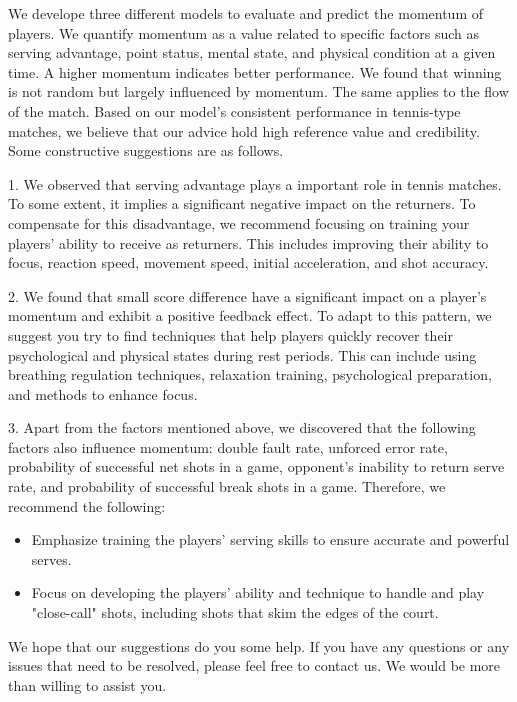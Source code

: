\documentclass{mcmthesis}
\begin{document}
\maketitle
\tableofcontents
\newpage
\memodate{\today}
 \begin{memo}[Memorandum]
We develope three different models to evaluate and predict the momentum of players. We quantify momentum as a value related to specific factors such as serving advantage, point status, mental state, and physical condition at a given time. A higher momentum indicates better performance. We found that winning is not random but  largely influenced by momentum. The same applies to the flow of the match. Based on our model's consistent performance in tennis-type matches, we believe that our advice hold high reference value and credibility. Some constructive suggestions are as follows.

1. We observed that serving advantage plays a important role in tennis matches. To some extent, it implies a significant negative impact on the returners. To compensate for this disadvantage, we recommend focusing on training your players' ability to receive as returners. This includes improving their ability to focus, reaction speed, movement speed, initial acceleration, and shot accuracy.

2. We found that small score difference have a significant impact on a player's momentum and exhibit a positive feedback effect. To adapt to this pattern, we suggest you try to find techniques that help players quickly recover their psychological and physical states during rest periods. This can include using breathing regulation techniques, relaxation training, psychological preparation, and methods to enhance focus. 

3. Apart from the factors mentioned above, we discovered that the following factors also influence momentum: double fault rate, unforced error rate, probability of successful net shots in a game, opponent's inability to return serve rate, and probability of successful break shots in a game. Therefore, we recommend the following:
\begin{itemize}
\item Emphasize training the players' serving skills to ensure accurate and powerful serves.
\item Focus on developing the players' ability and technique to handle and play "close-call" shots, including shots that skim the edges of the court.

\end{itemize}

We hope that our suggestions do you some help. If you have any questions or any issues that need to be resolved, please feel free to contact us. We would be more than willing to assist you.

 \end{memo}
\end{document}
